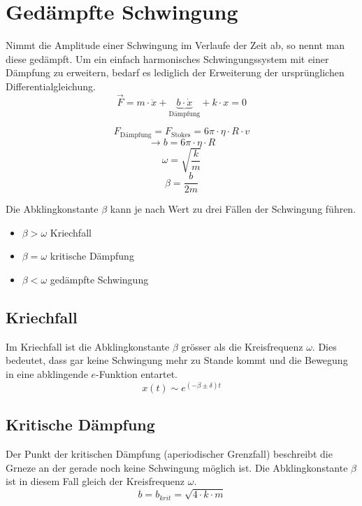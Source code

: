 \section{Gedämpfte Schwingung}
Nimmt die Amplitude einer Schwingung im Verlaufe der Zeit ab, so nennt 
man diese gedämpft. Um ein einfach harmonisches Schwingungssystem mit 
einer Dämpfung zu erweitern, bedarf es lediglich der Erweiterung der
ursprünglichen Differentialgleichung.
\[ \boxed{\vec{F} 
	= m \cdot \ddot{x} + \underbrace{
		b \cdot \dot{x}}_{\text{Dämpfung}} 
	+ k \cdot x = 0
} \]


\[ \boxed{F_{\text{Dämpfung}} = F_{\text{Stokes}} 
= 6 \pi \cdot \eta \cdot R \cdot v} \]
\[ \boxed{\rightarrow b = 6 \pi \cdot \eta \cdot R} \]
\[ \boxed{\omega = \sqrt{\frac{k}{m}}} \]
\[ \boxed{\beta = \frac{b}{2 m}} \]

Die Abklingkonstante $\beta$ kann je nach Wert zu drei Fällen der
Schwingung führen.
\begin{itemize}
	\item $\beta > \omega$ \hfill{} Kriechfall
	\item $\beta = \omega$ \hfill{} kritische Dämpfung
	\item $\beta < \omega$ \hfill{} gedämpfte Schwingung
\end{itemize}

\subsection{Kriechfall}
Im Kriechfall ist die Abklingkonstante $\beta$ grösser als die 
Kreisfrequenz $\omega$. Dies bedeutet, dass gar keine Schwingung
mehr zu Stande kommt und die Bewegung in eine abklingende 
$e$-Funktion entartet.
\[ \boxed{x(t) \sim e^{(-\beta \pm \delta)t}} \]

\subsection{Kritische Dämpfung}
Der Punkt der kritischen Dämpfung (aperiodischer Grenzfall) beschreibt
die Grneze an der gerade noch keine Schwingung möglich ist. Die 
Abklingkonstante $\beta$ ist in diesem Fall gleich der Kreisfrequenz
$\omega$. 
\[ \boxed{b = b_{krit} = \sqrt{4 \cdot k \cdot m}} \]

